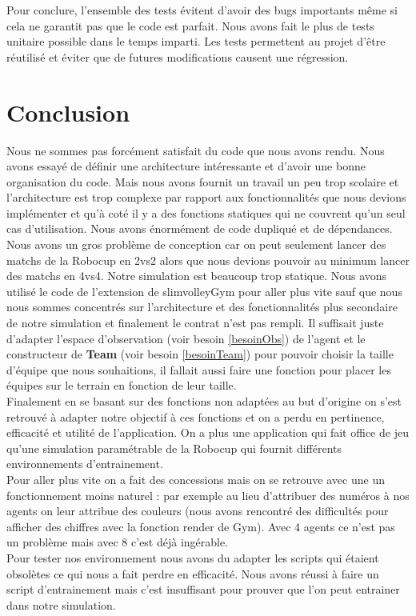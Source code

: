 \documentclass[11pt, a4paper]{article}
\begin{document}
	Pour conclure, l'ensemble des tests évitent d'avoir des bugs importants même si cela ne garantit pas que le code est parfait.
	Nous avons fait le plus de tests unitaire possible dans le temps imparti. Les tests permettent au projet d'être réutilisé
	et éviter que de futures modifications causent une régression.

	\newpage
	\section{Conclusion}
	Nous ne sommes pas forcément satisfait du code que nous avons rendu. Nous avons essayé de définir une architecture intéressante et d'avoir une bonne organisation du code. Mais nous avons fournit un travail un peu trop scolaire et l'architecture est trop complexe par rapport aux fonctionnalités que nous devions implémenter et qu'à coté il y a des fonctions statiques qui ne couvrent qu'un seul cas d'utilisation. Nous avons énormément de code dupliqué et de dépendances.\\

	Nous avons un gros problème de conception car on peut seulement lancer des matchs de la Robocup en 2vs2 alors que nous devions pouvoir au minimum lancer des matchs en 4vs4. Notre simulation est beaucoup trop statique. Nous avons utilisé le code de l'extension de slimvolleyGym pour aller plus vite sauf que nous nous sommes concentrés sur l'architecture et des fonctionnalités plus secondaire de notre simulation et finalement le contrat n'est pas rempli. Il suffisait juste d'adapter l'espace d'observation (voir besoin \ref{besoinObs}) de l'agent et le constructeur de \textbf{Team} (voir besoin \ref{besoinTeam})  pour pouvoir choisir la taille d'équipe que nous souhaitions, il fallait aussi faire une fonction pour placer les équipes sur le terrain en fonction de leur taille. \\
	Finalement en se basant sur des fonctions non adaptées au but d'origine on s'est retrouvé à adapter notre objectif à ces fonctions et on a perdu en pertinence, efficacité et utilité de l'application. On a plus une application qui fait office de jeu qu'une simulation paramétrable de la Robocup qui fournit différents environnements d'entrainement. \\
	Pour aller plus vite on a fait des concessions mais on se retrouve avec une un fonctionnement moins naturel : par exemple au lieu d'attribuer des numéros à nos agents on leur attribue des couleurs (nous avons rencontré des difficultés pour afficher des chiffres avec la fonction render de Gym). Avec 4 agents ce n'est pas un problème mais avec 8 c'est déjà ingérable.\\
	Pour tester nos environnement nous avons du adapter les scripts qui étaient obsolètes ce qui nous a fait perdre en efficacité. Nous avons réussi à faire un script d'entrainement mais c'est insuffisant pour prouver que l'on peut entrainer dans notre simulation.
\end{document}
